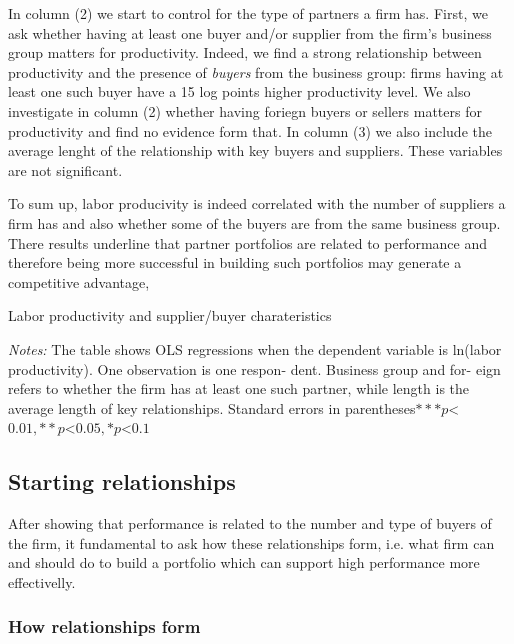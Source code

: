 \documentclass[final, dvipsnames, authoryear,12pt]{elsarticle}
\begin{document}
In column (2) we start to control for the type of partners a firm has. First, we ask whether having at least one buyer and/or supplier from the firm's business group matters for productivity. Indeed, we find a strong relationship between productivity and the presence of \textit{buyers} from the business group: firms having at least one such buyer have a 15 log points higher productivity level. We also investigate in column (2) whether having foriegn buyers or sellers matters for productivity and find no evidence form that. In column (3) we also include the average lenght of the relationship with key buyers and suppliers. These variables are not significant.

To sum up, labor producivity is indeed correlated with the number of suppliers a firm has and also whether some of the buyers are from the same business group. There results underline that partner portfolios are related to performance and therefore being more successful in building such portfolios may generate a competitive advantage,

\begin{table}[H]
    \caption{Labor productivity and supplier/buyer charateristics}
    \label{tab:prod_regs}
    \centerline{}
    {\scriptsize \textit{Notes:} The table shows OLS regressions when the dependent variable is ln(labor productivity). One observation is one respon- dent. Business group and for- eign refers to whether the firm has at least one such partner, while length is the average length of key relationships. Standard errors in parentheses$ *** p$<$0.01, ** p$<$0.05, * p$<$0.1 $}
\end{table}
    



\subsection{Starting relationships}

After showing that performance is related to the number and type of buyers of the firm, it fundamental to ask how these relationships form, i.e. what firm can and should do to build a portfolio which can support high performance more effectivelly.

\subsubsection{How relationships form}
\end{document}
